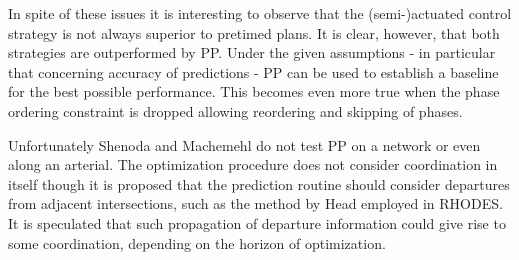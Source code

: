 In spite of these issues it is interesting to observe that the
(semi-)actuated control strategy is not always superior to pretimed
plans. It is clear, however, that both strategies are outperformed by
PP. Under the given assumptions - in particular that concerning
accuracy of predictions - PP can be used to establish a baseline for
the best possible performance. This becomes even more true when the
phase ordering constraint is dropped allowing reordering and skipping
of phases.

Unfortunately Shenoda and Machemehl do not test PP on a network or
even along an arterial. The optimization procedure does not consider
coordination in itself though it is proposed that the prediction
routine should consider departures from adjacent intersections, such
as the method by Head employed in RHODES. It is speculated that such
propagation of departure information could give rise to some
coordination, depending on the horizon of optimization.
